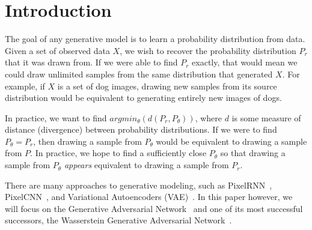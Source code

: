 
\section{Introduction} 

The goal of any generative model is to learn a probability distribution from data. Given a set of observed data $X$, we wish to recover the probability distribution $P_r$ that it was drawn from. If we were able to find $P_r$ exactly, that would mean we could draw unlimited samples from the same distribution that generated $X$. For example, if $X$ is a set of dog images, drawing new samples from its source distribution would be equivalent to generating entirely new images of dogs. 


In practice, we want to find $argmin_\theta(d(P_r, P_\theta))$, where $d$ is some measure of distance (divergence) between probability distributions. If we were to find $P_\theta=P_r$, then drawing a sample from $P_\theta$ would be equivalent to drawing a sample from $P$. In practice, we hope to find a sufficiently close $P_\theta$ so that drawing a sample from $P_\theta$ \textit{appears} equivalent to drawing a sample from $P_r$.

There are many approaches to generative modeling, such as PixelRNN~\cite{Oord2016}, PixelCNN~\cite{Oord2016a}, and Variational Autoencoders (VAE)~\cite{Pu2016}. In this paper however, we will focus on the Generative Adversarial Network~\cite{Goodfellow2017} and one of its most successful successors, the Wasserstein Generative Adversarial Network~\cite{Arjovsky2017}.

\subsection{}